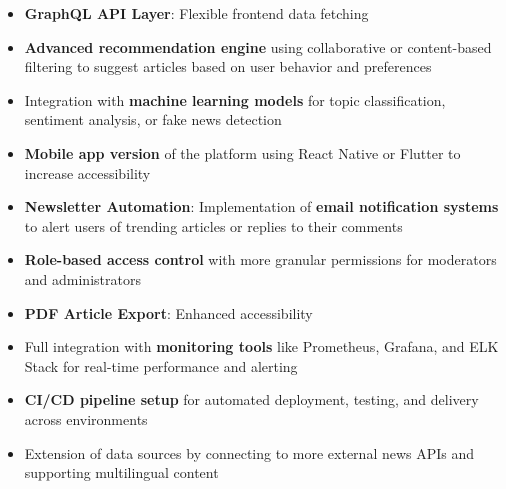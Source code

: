 \begin{itemize}
    \item \textbf{GraphQL API Layer}: Flexible frontend data fetching
    \item \textbf{Advanced recommendation engine} using collaborative or content-based filtering to suggest articles based on user behavior and preferences
    \item Integration with \textbf{machine learning models} for topic classification, sentiment analysis, or fake news detection
    \item \textbf{Mobile app version} of the platform using React Native or Flutter to increase accessibility
    \item \textbf{Newsletter Automation}: Implementation of \textbf{email notification systems} to alert users of trending articles or replies to their comments
    \item \textbf{Role-based access control} with more granular permissions for moderators and administrators
    \item \textbf{PDF Article Export}: Enhanced accessibility
    \item Full integration with \textbf{monitoring tools} like Prometheus, Grafana, and ELK Stack for real-time performance and alerting
    \item \textbf{CI/CD pipeline setup} for automated deployment, testing, and delivery across environments
    \item Extension of data sources by connecting to more external news APIs and supporting multilingual content
\end{itemize}









